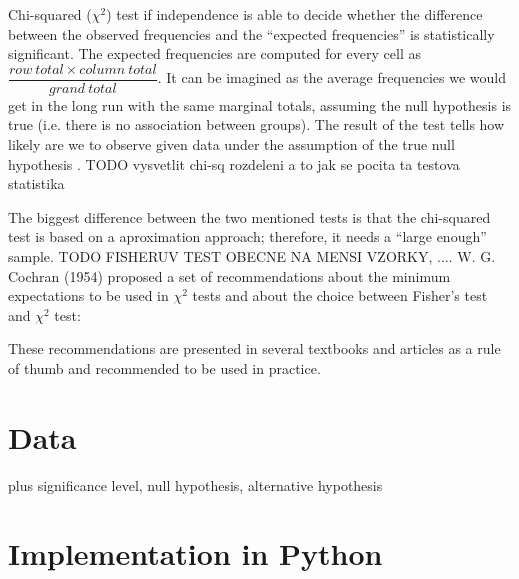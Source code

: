 Chi-squared ($\chi^{2}$) test if independence is able to decide whether the difference between the observed frequencies and the ``expected frequencies'' is statistically significant. The expected frequencies are computed for every cell as 
$\dfrac{row\: total\times column\:total}{grand\:total}$.
It can be imagined as the average frequencies we would get in the long run with the same marginal totals, assuming the null hypothesis is true (i.e. there is no association between groups). The result of the test tells how likely are we to observe given data under the assumption of the true null hypothesis \cite{bland}. TODO vysvetlit chi-sq rozdeleni a to jak se pocita ta testova statistika

The biggest difference between the two mentioned tests is that the chi-squared test is based on a aproximation approach; therefore, it needs a ``large enough'' sample. TODO FISHERUV TEST OBECNE NA MENSI VZORKY, .... W. G. Cochran (1954) \cite{cochran} proposed a set of recommendations about the minimum expectations to be used in $\chi^{2}$ tests and about the choice between Fisher's test and $\chi^{2}$ test:


These recommendations are presented in several textbooks and articles as a rule of thumb \cite{} and recommended to be used in practice.





\section{Data}
plus significance level, null hypothesis, alternative hypothesis


\section{Implementation in Python}


